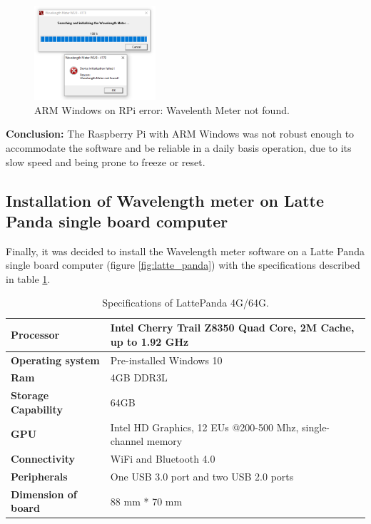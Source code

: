 \documentclass[a4paper,12pt]{article}
\begin{document}
\begin{figure}[!h]
    \centering
    \includegraphics[width=0.4\textwidth]{Images/device_not_found.png}
    \captionsetup{justification=centering}
    \caption{ARM Windows on RPi error: Wavelenth Meter not found.}
    \label{fig:device_not_found}
\end{figure}

\textbf{Conclusion:} The Raspberry Pi with ARM Windows was not robust enough to accommodate the software and be reliable in a daily basis operation, due to its slow speed and being prone to freeze or reset.

\subsection{Installation of Wavelength meter on Latte Panda single board computer}
\label{section:installation_lattepanda}

Finally, it was decided to install the Wavelength meter software on a Latte Panda single board computer (figure \ref{fig:latte_panda}) with the specifications described in table \ref{table:latte_panda_specs}.

\renewcommand{\arraystretch}{1.1}

\begin{table}[!h]
\begin{tabular}{ | l | l | }
\hline
\textbf{Processor}          & Intel Cherry Trail Z8350 Quad Core, 2M Cache, up to 1.92 GHz  \\ \hline
\textbf{Operating system}   & Pre-installed Windows 10                                      \\ \hline
\textbf{Ram}                & 4GB DDR3L                                                     \\ \hline
\textbf{Storage Capability} & 64GB                                                          \\ \hline
\textbf{GPU}                & Intel HD Graphics, 12 EUs @200-500 Mhz, single-channel memory \\ \hline
\textbf{Connectivity}       & WiFi and Bluetooth 4.0                                        \\ \hline
\textbf{Peripherals}        & One USB 3.0 port and two USB 2.0 ports                         \\ \hline
\textbf{Dimension of board} & 88 mm * 70 mm                                                    \\ \hline
\end{tabular}
\caption{Specifications of LattePanda 4G/64G.}
\label{table:latte_panda_specs}
\end{table}
\end{document}
